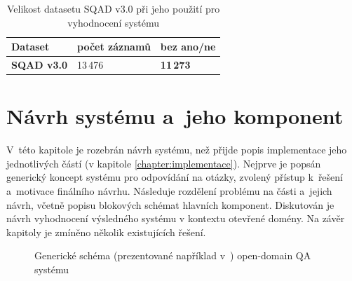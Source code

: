 \begin{table}[H]
\centering
\begin{tabular}{|l|l|l|}
\hline
Dataset            & počet záznamů & bez ano/ne      \\ \hline
\textbf{SQAD v3.0} & 13\,476        & \textbf{11\,273} \\ \hline
\end{tabular}
\caption{Velikost datasetu SQAD v3.0 při jeho použití pro vyhodnocení systému}
\label{tab:sqad_size}
\end{table}


\chapter{Návrh systému a~jeho komponent}
\label{chapter:design_}
V~této kapitole je rozebrán návrh systému, než přijde popis implementace jeho jednotlivých částí (v kapitole \ref{chapter:implementace}). Nejprve je popsán generický koncept systému pro odpovídání na otázky, zvolený přístup k~řešení a~motivace finálního návrhu. Následuje rozdělení problému na části a~jejich návrh, včetně popisu blokových schémat hlavních komponent. Diskutován je návrh vyhodnocení výsledného systému v kontextu otevřené domény. Na závěr kapitoly je zmíněno několik existujících řešení.

\begin{figure}[hbt]
	\centering
	\caption{Generické schéma (prezentované například v~\cite{drQA}) open-domain QA systému}
	\label{qa_scheme}
\end{figure}

